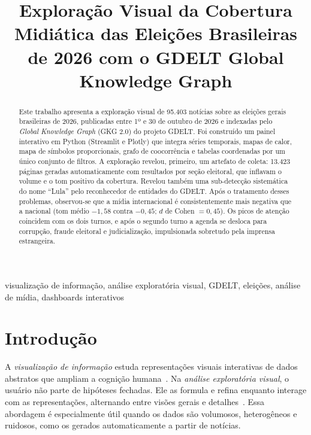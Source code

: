 \documentclass[conference]{IEEEtran}
\begin{document}
\title{Exploração Visual da Cobertura Midiática das Eleições Brasileiras de 2026 com o GDELT Global Knowledge Graph}

\author{
}

\maketitle

\begin{abstract}
Este trabalho apresenta a exploração visual de 95.403 notícias sobre as eleições gerais brasileiras de 2026, publicadas entre 1º e 30 de outubro de 2026 e indexadas pelo \emph{Global Knowledge Graph} (GKG 2.0) do projeto GDELT. Foi construído um painel interativo em Python (Streamlit e Plotly) que integra séries temporais, mapas de calor, mapa de símbolos proporcionais, grafo de coocorrência e tabelas coordenadas por um único conjunto de filtros. A exploração revelou, primeiro, um artefato de coleta: 13.423 páginas geradas automaticamente com resultados por seção eleitoral, que inflavam o volume e o tom positivo da cobertura. Revelou também uma sub-detecção sistemática do nome ``Lula'' pelo reconhecedor de entidades do GDELT. Após o tratamento desses problemas, observou-se que a mídia internacional é consistentemente mais negativa que a nacional (tom médio $-1{,}58$ contra $-0{,}45$; $d$ de Cohen $=0{,}45$). Os picos de atenção coincidem com os dois turnos, e após o segundo turno a agenda se desloca para corrupção, fraude eleitoral e judicialização, impulsionada sobretudo pela imprensa estrangeira.
\end{abstract}

\begin{IEEEkeywords}
visualização de informação, análise exploratória visual, GDELT, eleições, análise de mídia, dashboards interativos
\end{IEEEkeywords}

\section{Introdução}
A \emph{visualização de informação} estuda representações visuais interativas de dados abstratos que ampliam a cognição humana~\cite{card1999,munzner2014}. Na \emph{análise exploratória visual}, o usuário não parte de hipóteses fechadas. Ele as formula e refina enquanto interage com as representações, alternando entre visões gerais e detalhes~\cite{shneiderman1996,keim2002}. Essa abordagem é especialmente útil quando os dados são volumosos, heterogêneos e ruidosos, como os gerados automaticamente a partir de notícias.
\end{document}
